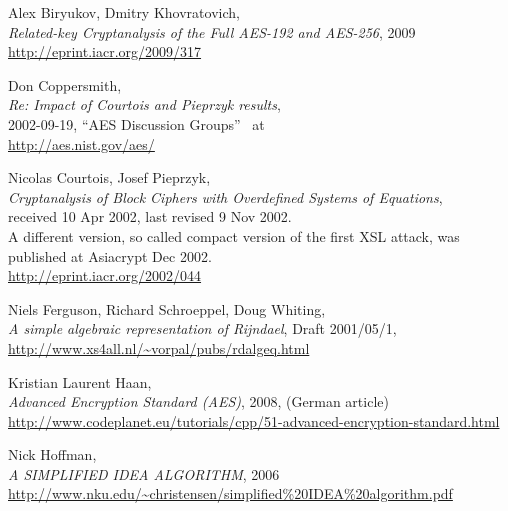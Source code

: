 \newpage
\begin{thebibliography}{99999}

 
	Alex Biryukov, Dmitry Khovratovich, \\
	{\em Related-key Cryptanalysis of the Full AES-192 and AES-256},
	2009 \\
	\url{http://eprint.iacr.org/2009/317}

  
        Don Coppersmith, \\
        {\em Re: Impact of Courtois and Pieprzyk results}, \\
        2002-09-19, ``AES Discussion Groups''~ at \\
        \url{http://aes.nist.gov/aes/}

  
        Nicolas Courtois, Josef Pieprzyk, \\
        {\em Cryptanalysis of Block Ciphers with Overdefined Systems
             of Equations}, \\
        received 10 Apr 2002, last revised 9 Nov 2002.\\
        A different version, so called compact version of the first XSL attack,
        was published at Asiacrypt Dec 2002. \\
        \url{http://eprint.iacr.org/2002/044}

  
       Niels Ferguson, Richard Schroeppel, Doug Whiting, \\
       {\em A simple algebraic representation of Rijndael}, 
       Draft 2001/05/1, \\
       \url{http://www.xs4all.nl/~vorpal/pubs/rdalgeq.html}

  
       Kristian Laurent Haan, \\
       {\em Advanced Encryption Standard (AES)},
       2008, (German article)\\
       \url{http://www.codeplanet.eu/tutorials/cpp/51-advanced-encryption-standard.html}

  
       Nick Hoffman, \\
       {\em A SIMPLIFIED IDEA ALGORITHM},
       2006 \\
       \url{http://www.nku.edu/~christensen/simplified%20IDEA%20algorithm.pdf}


\end{thebibliography}
